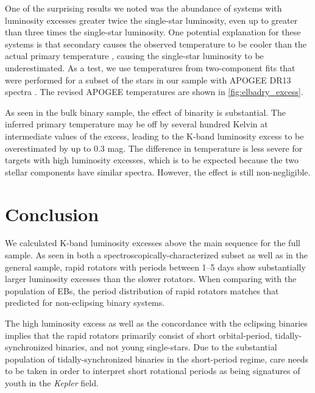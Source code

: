 \documentclass[manuscript]{aastex6}
\newcommand{\Kepler}{\mbox{\textit{Kepler}}}
\begin{document}
One of the surprising results we noted was the abundance of systems with
luminosity excesses greater twice the single-star luminosity, even up to
greater than three times the single-star luminosity. One potential
explanation for these systems is that secondary causes the observed temperature
to be cooler than the actual primary temperature \citep{ElBadry18a}, causing the single-star
luminosity to be underestimated. As a test, we use temperatures from
two-component fits that were performed for a subset of the stars in our sample
with APOGEE DR13 spectra \citep{ElBadry18b}. The revised APOGEE temperatures are
shown in \cref{fig:elbadry_excess}.

As seen in the bulk binary sample, the effect of binarity is substantial. The
inferred primary temperature may be off by several hundred Kelvin at
intermediate values of the excess, leading to the K-band luminosity excess to
be overestimated by up to 0.3 mag. The difference in temperature is less severe
for targets with high luminosity excesses, which is to be expected because the
two stellar components have similar spectra. However, the effect is still
non-negligible.

\section{Conclusion}
\label{sec:conclusions}

We calculated K-band luminosity excesses above the main sequence for the full
\citet{McQuillan14} sample. As seen in both a spectroscopically-characterized
subset as well as in the general sample, rapid rotators with periods between
1--5 days show substantially larger luminosity excesses than the slower
rotators. When comparing with the population of EBs, the period distribution of
rapid rotators matches that predicted for non-eclipsing binary systems.

The high luminosity excess as well as the concordance with the eclipsing
binaries implies that the rapid rotators primarily consist of short
orbital-period, tidally-synchronized binaries, and not young
single-stars. Due to the substantial population of tidally-synchronized
binaries in the short-period regime, care needs to be taken in order to
interpret short rotational periods as being signatures of youth in the
\Kepler{} field.



\end{document}
